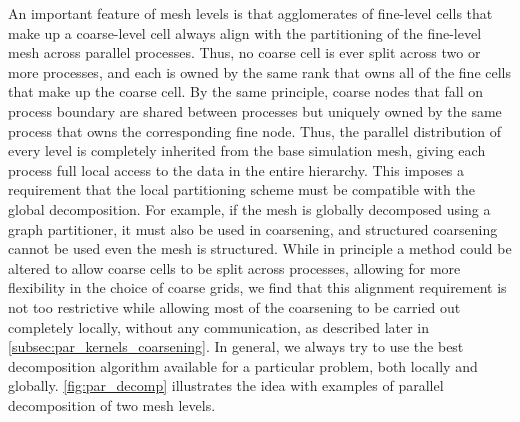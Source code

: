 An important feature of mesh levels is that agglomerates of fine-level cells that make up a coarse-level cell always align with the partitioning of the fine-level mesh across parallel processes.   Thus, no coarse cell is ever split across two or more processes, and each is owned by the same rank that owns all of the fine cells that make up the coarse cell.   By the same principle, coarse nodes that fall on process boundary are shared between processes but uniquely owned by the same process that owns the corresponding fine node.   Thus, the parallel distribution of every level is completely inherited from the base simulation mesh, giving each process full local access to the data in the entire hierarchy.   This imposes a requirement that the local partitioning scheme must be compatible with the global decomposition.   For example, if the mesh is globally decomposed using a graph partitioner, it must also be used in coarsening, and structured coarsening cannot be used even the mesh is structured.    While in principle a method could be altered to allow coarse cells to be split across processes, allowing for more flexibility in the choice of coarse grids, we find that this alignment requirement is not too restrictive while allowing most of the coarsening to be carried out completely locally, without any communication, as described later in \autoref{subsec:par_kernels_coarsening}.   In general, we always try to use the best decomposition algorithm available for a particular problem, both locally and globally.   \autoref{fig:par_decomp} illustrates the idea with examples of parallel decomposition of two mesh levels.


